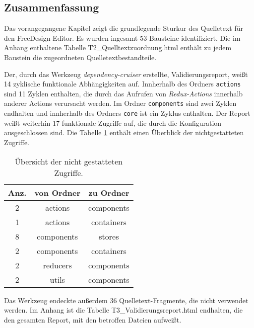 \subsection{Zusammenfassung}
Das vorangegangene Kapitel zeigt die grundlegende Sturkur des Quelletext für den FreeDesign-Editor. 
Es wurden ingesamt 53 Bausteine identifiziert. Die im Anhang enthaltene Tabelle T2\_Quelltextzuordnung.html enthält zu jedem Baustein die zugeordneten Quelletextbestandteile.  

Der, durch das Werkzeug \emph{dependency-cruiser} erstellte, Validierungsreport, weißt 14 zyklische funktionale Abhängigkeiten auf.
Innherhalb des Ordners \lstinline|actions| sind 11 Zyklen enthalten, die durch das Aufrufen von \emph{Redux-Actions} innerhalb anderer Actions verursacht werden. 
Im Ordner \lstinline|components| sind zwei Zyklen endhalten und innherhalb des Ordners \lstinline|core| ist ein Zyklus enthalten.
Der Report weißt weiterhin 17 funktionale Zugriffe auf, die durch die Konfiguration ausgeschlossen sind. 
Die Tabelle \ref{table:not_allowed} enthält einen Überblick der nichtgestatteten Zugriffe.
\newpage
\begin{table}
    \centering
    \caption{Übersicht der nicht gestatteten Zugriffe.}
    \begin{tabular}{c|c|c}        
        \label{table:not_allowed}
        Anz. & von Ordner & zu Ordner \\
        \hline
        2 & actions & components \\
        1 & actions & containers \\
        8 & components & stores \\
        2 & components & containers \\
        2 & reducers & components \\
        2 & utils & components \\
    \end{tabular}
\end{table}    
 
Das Werkzeug endeckte außerdem 36 Quelletext-Fragmente, die nicht verwendet werden. 
Im Anhang ist die Tabelle T3\_Validierungsreport.html endhalten, die den gesamten Report, mit den betroffen Dateien aufweißt. 




